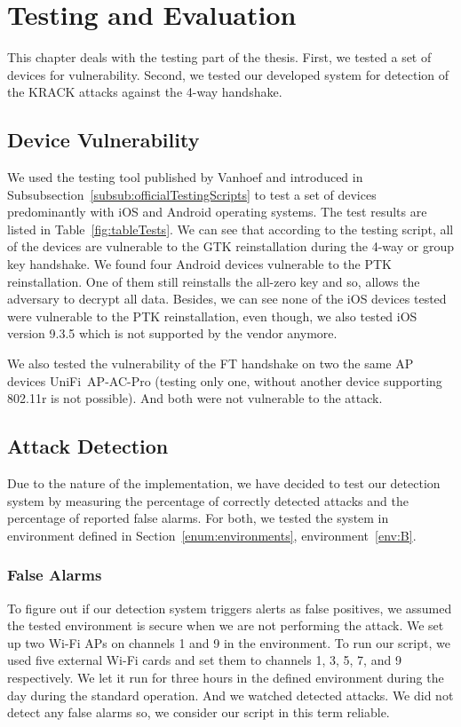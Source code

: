 \chapter{Testing and Evaluation}
\label{chap:testing}

This chapter deals with the testing part of the thesis. First, we tested a set of devices for vulnerability. Second, we tested our developed system for detection of the KRACK attacks against the 4-way handshake.

\section{Device Vulnerability}

We used the testing tool published by Vanhoef and introduced in Subsubsection~\ref{subsub:officialTestingScripts} to test a set of devices predominantly with iOS and Android operating systems. The test results are listed in Table~\ref{fig:tableTests}. We can see that according to the testing script, all of the devices are vulnerable to the GTK reinstallation during the 4-way or group key handshake. We found four Android devices vulnerable to the PTK reinstallation. One of them still reinstalls the all-zero key and so, allows the adversary to decrypt all data. Besides, we can see none of the iOS devices tested were vulnerable to the PTK reinstallation, even though, we also tested iOS version 9.3.5 which is not supported by the vendor anymore.

We also tested the vulnerability of the FT handshake on two the same AP devices UniFi~AP-AC-Pro (testing only one, without another device supporting 802.11r is not possible). And both were not vulnerable to the attack.  

\section{Attack Detection}

Due to the nature of the implementation, we have decided to test our detection system by measuring the percentage of correctly detected attacks and the percentage of reported false alarms. For both, we tested the system in environment defined in Section~\ref{enum:environments}, environment~\ref{env:B}.

\subsection{False Alarms}
To figure out if our detection system triggers alerts as false positives, we assumed the tested environment is secure when we are not performing the attack. We set up two Wi-Fi APs on channels 1 and 9 in the environment. To run our script, we used five external Wi-Fi cards and set them to channels 1, 3, 5, 7, and 9 respectively. We let it run for three hours in the defined environment during the day during the standard operation. And we watched detected attacks. We did not detect any false alarms so, we consider our script in this term reliable.

